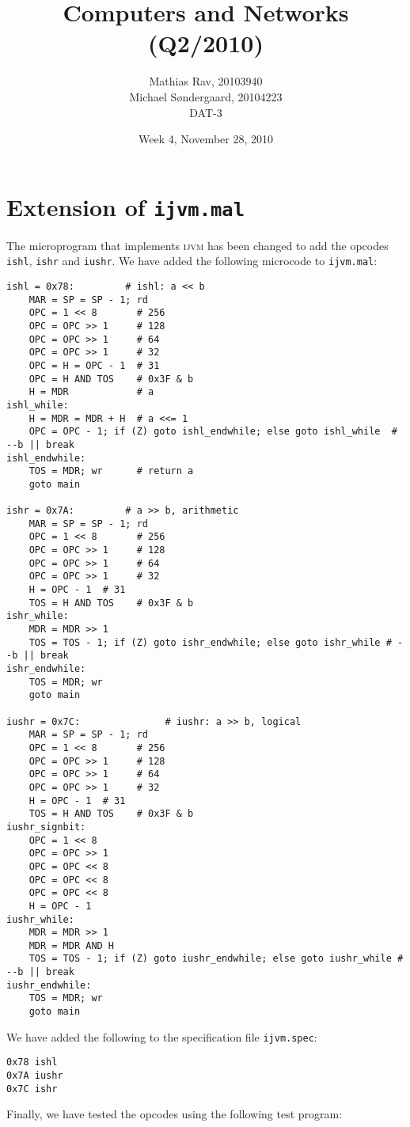 \documentclass[12pt,a4paper]{article}
\title{Computers and Networks (Q2/2010)}
\author{Mathias Rav, 20103940 \\
		Michael Søndergaard, 20104223 \\
		DAT-3}
\date{Week 4, November 28, 2010}
\newcommand{\ishl}{\texttt{ishl}}
\newcommand{\ishr}{\texttt{ishr}}
\newcommand{\iushr}{\texttt{iushr}}
\newcommand{\ijvm}{\textsc{ijvm}}
\newcommand{\ijvmmal}{\texttt{ijvm.mal}}
\newcommand{\ijvmspec}{\texttt{ijvm.spec}}
\begin{document}
\maketitle

\section{Extension of \ijvmmal}
The microprogram that implements \ijvm{} has been changed to add the opcodes \ishl, \ishr{} and \iushr. We have added the following microcode to \ijvmmal:
\begin{lstlisting}
ishl = 0x78:         # ishl: a << b
	MAR = SP = SP - 1; rd
	OPC = 1 << 8       # 256
	OPC = OPC >> 1     # 128
	OPC = OPC >> 1     # 64
	OPC = OPC >> 1     # 32
	OPC = H = OPC - 1  # 31
	OPC = H AND TOS    # 0x3F & b
	H = MDR            # a
ishl_while:
	H = MDR = MDR + H  # a <<= 1
	OPC = OPC - 1; if (Z) goto ishl_endwhile; else goto ishl_while  # --b || break
ishl_endwhile:
	TOS = MDR; wr      # return a
	goto main

ishr = 0x7A:         # a >> b, arithmetic
	MAR = SP = SP - 1; rd
	OPC = 1 << 8       # 256
	OPC = OPC >> 1     # 128
	OPC = OPC >> 1     # 64
	OPC = OPC >> 1     # 32
	H = OPC - 1  # 31
	TOS = H AND TOS    # 0x3F & b
ishr_while:
	MDR = MDR >> 1
	TOS = TOS - 1; if (Z) goto ishr_endwhile; else goto ishr_while # --b || break
ishr_endwhile:
	TOS = MDR; wr	
	goto main

iushr = 0x7C:				# iushr: a >> b, logical
	MAR = SP = SP - 1; rd
	OPC = 1 << 8       # 256
	OPC = OPC >> 1     # 128
	OPC = OPC >> 1     # 64
	OPC = OPC >> 1     # 32
	H = OPC - 1  # 31
	TOS = H AND TOS    # 0x3F & b
iushr_signbit:
	OPC = 1 << 8
	OPC = OPC >> 1
	OPC = OPC << 8
	OPC = OPC << 8
	OPC = OPC << 8
	H = OPC - 1
iushr_while:
	MDR = MDR >> 1
	MDR = MDR AND H
	TOS = TOS - 1; if (Z) goto iushr_endwhile; else goto iushr_while # --b || break
iushr_endwhile:
	TOS = MDR; wr	
	goto main
\end{lstlisting}
We have added the following to the specification file \ijvmspec:
\begin{lstlisting}
0x78 ishl
0x7A iushr
0x7C ishr
\end{lstlisting}
Finally, we have tested the opcodes using the following test program:
\end{document}
